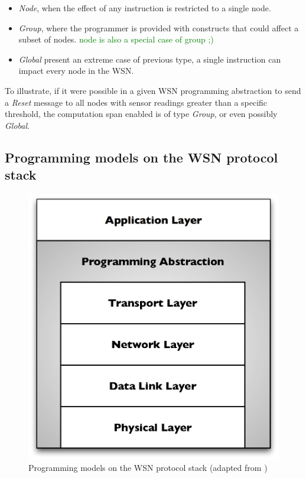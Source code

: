 \begin{itemize}
  \item \emph{Node}, when the effect of any instruction is restricted to a
  single node.
  \item \emph{Group}, where the programmer is provided with constructs that
  could affect a subset of nodes. \textcolor{green}{node is also a special case
  of group ;)}
  \item \emph{Global} present an extreme case of previous type, a single
  instruction can impact every node in the WSN.
\end{itemize}

To illustrate, if it were possible in a given WSN programming abstraction to
send a \emph{Reset} message to all nodes with sensor readings greater than a
specific threshold, the computation span enabled is of type \emph{Group}, or
even possibly \emph{Global}.

\subsection{Programming models on the WSN protocol stack}

\begin{figure}
\centering
\label{Fig:ProtStack_ProgAbstr}
\includegraphics[scale=0.6]{img/ProtStack_ProgAbstr.eps}\caption[Programming
models on the WSN protocol stack]{Programming models on the WSN protocol
stack (adapted from \cite{mottola_middleware:2008})}
\end{figure}

